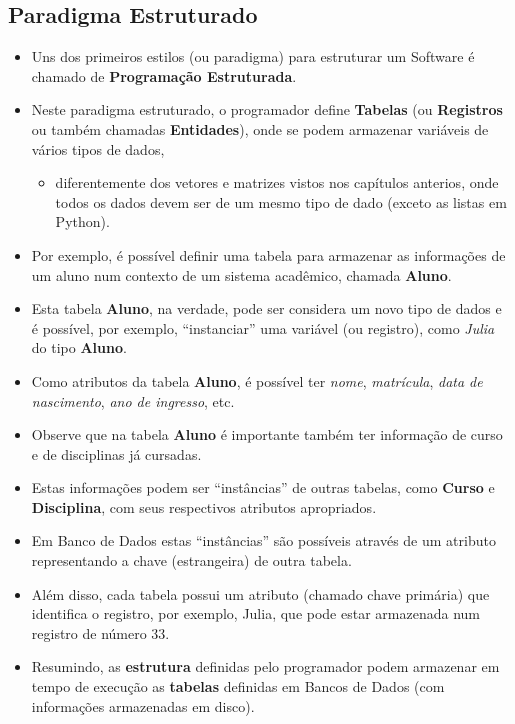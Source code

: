 \documentclass[12pt,a4paper]{article}
\providecommand{\tightlist}{%
      \setlength{\itemsep}{0pt}\setlength{\parskip}{0pt}}
\begin{document}
    \hypertarget{paradigma-estruturado}{%
\subsection{Paradigma Estruturado}\label{paradigma-estruturado}}

    \begin{itemize}
\item
  Uns dos primeiros estilos (ou paradigma) para estruturar um Software é
  chamado de \textbf{Programação Estruturada}.
\item
  Neste paradigma estruturado, o programador define \textbf{Tabelas} (ou
  \textbf{Registros} ou também chamadas \textbf{Entidades}), onde se
  podem armazenar variáveis de vários tipos de dados,

  \begin{itemize}
  \tightlist
  \item
    diferentemente dos vetores e matrizes vistos nos capítulos anterios,
    onde todos os dados devem ser de um mesmo tipo de dado (exceto as
    listas em Python).
  \end{itemize}
\item
  Por exemplo, é possível definir uma tabela para armazenar as
  informações de um aluno num contexto de um sistema acadêmico, chamada
  \textbf{Aluno}.
\item
  Esta tabela \textbf{Aluno}, na verdade, pode ser considera um novo
  tipo de dados e é possível, por exemplo, ``instanciar'' uma variável
  (ou registro), como \emph{Julia} do tipo \textbf{Aluno}.
\item
  Como atributos da tabela \textbf{Aluno}, é possível ter \emph{nome},
  \emph{matrícula}, \emph{data de nascimento}, \emph{ano de ingresso},
  etc.
\item
  Observe que na tabela \textbf{Aluno} é importante também ter
  informação de curso e de disciplinas já cursadas.
\item
  Estas informações podem ser ``instâncias'' de outras tabelas, como
  \textbf{Curso} e \textbf{Disciplina}, com seus respectivos atributos
  apropriados.
\item
  Em Banco de Dados estas ``instâncias'' são possíveis através de um
  atributo representando a chave (estrangeira) de outra tabela.
\item
  Além disso, cada tabela possui um atributo (chamado chave primária)
  que identifica o registro, por exemplo, Julia, que pode estar
  armazenada num registro de número 33.
\item
  Resumindo, as \textbf{estrutura} definidas pelo programador podem
  armazenar em tempo de execução as \textbf{tabelas} definidas em Bancos
  de Dados (com informações armazenadas em disco).
\end{itemize}
\end{document}
